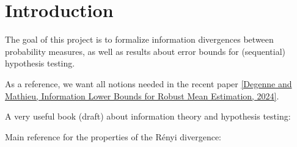 \chapter*{Introduction}

The goal of this project is to formalize information divergences between probability measures, as well as results about error bounds for (sequential) hypothesis testing.

As a reference, we want all notions needed in the recent paper \href{https://arxiv.org/abs/2403.01892}{[Degenne and Mathieu, Information Lower Bounds for Robust Mean Estimation, 2024]}.

A very useful book (draft) about information theory and hypothesis testing: \cite{polyanskiy2024information} 

Main reference for the properties of the Rényi divergence: \cite{van2014renyi}